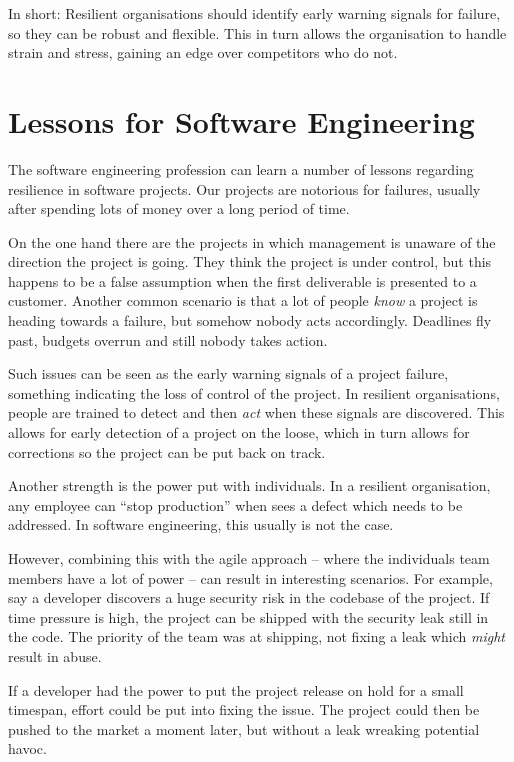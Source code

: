 In short: Resilient organisations should identify early warning signals for failure, so they can be robust and flexible.
This in turn allows the organisation to handle strain and stress, gaining an edge over competitors who do not.

\section{Lessons for Software Engineering}
The software engineering profession can learn a number of lessons regarding resilience in software projects.
Our projects are notorious for failures, usually after spending lots of money over a long period of time. 

On the one hand there are the projects in which management is unaware of the direction the project is going. 
They think the project is under control, but this happens to be a false assumption when the first deliverable is presented to a customer. 
Another common scenario is that a lot of people \emph{know} a project is heading towards a failure, but somehow nobody acts accordingly. 
Deadlines fly past, budgets overrun and still nobody takes action.

Such issues can be seen as the early warning signals of a project failure, something indicating the loss of control of the project. 
In resilient organisations, people are trained to detect and then \emph{act} when these signals are discovered. 
This allows for early detection of a project on the loose, which in turn allows for corrections so the project can be put back on track.

Another strength is the power put with individuals. 
In a resilient organisation, any employee can ``stop production'' when sees a defect which needs to be addressed. 
In software engineering, this usually is not the case.

However, combining this with the agile approach -- where the individuals team members have a lot of power -- can result in interesting scenarios. 
For example, say a developer discovers a huge security risk in the codebase of the project.
If time pressure is high, the project can be shipped with the security leak still in the code. 
The priority of the team was at shipping, not fixing a leak which \emph{might} result in abuse.

If a developer had the power to put the project release on hold for a small timespan, effort could be put into fixing the issue. 
The project could then be pushed to the market a moment later, but without a leak wreaking potential havoc.

